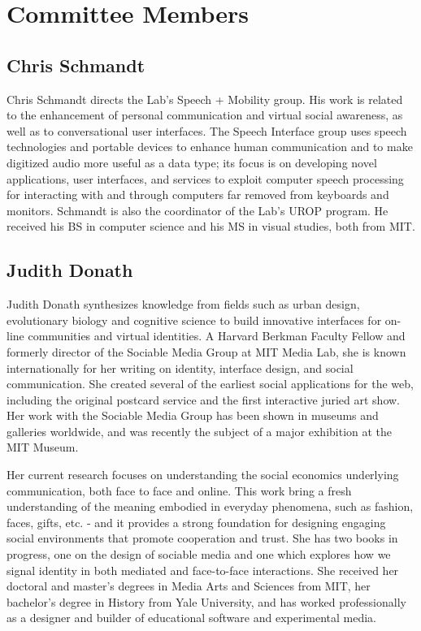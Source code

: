 \documentclass{tufte-handout}
\begin{document}


\section{Committee Members}

\subsection{Chris Schmandt}

Chris Schmandt directs the Lab's Speech + Mobility group. His work is related to the enhancement of personal communication and virtual social awareness, as well as to conversational user interfaces. The Speech Interface group uses speech technologies and portable devices to enhance human communication and to make digitized audio more useful as a data type; its focus is on developing novel applications, user interfaces, and services to exploit computer speech processing for interacting with and through computers far removed from keyboards and monitors. Schmandt is also the coordinator of the Lab's UROP program. He received his BS in computer science and his MS in visual studies, both from MIT.

\subsection{Judith Donath}

Judith Donath synthesizes knowledge from  fields such as 
urban design, evolutionary biology and cognitive science to 
build innovative interfaces for on-line communities and 
virtual identities. A Harvard Berkman Faculty Fellow and 
formerly director of the Sociable Media Group at MIT 
Media Lab, she is known internationally for her writing on 
identity, interface design, and social communication. She 
created several of the earliest social applications for the web, 
including the original postcard service and the  first 
interactive juried art show. Her work with the Sociable 
Media Group has been shown in museums and galleries 
worldwide, and was recently the subject of a major 
exhibition at the MIT Museum.

Her current research focuses on understanding the social 
economics underlying communication, both face to face 
and online.  This work bring a fresh understanding of the 
meaning embodied in everyday phenomena, such as 
fashion, faces, gifts, etc. - and it provides a strong 
foundation for designing engaging social environments 
that promote cooperation and trust. She has two books in 
progress, one on the design of sociable media and one 
which explores how we signal identity in both mediated and 
face-to-face interactions. She received her doctoral and 
master's degrees in Media Arts and Sciences from MIT, her 
bachelor's degree in History from Yale University, and has 
worked professionally as a designer and builder of 
educational software and experimental media.
\end{document}

